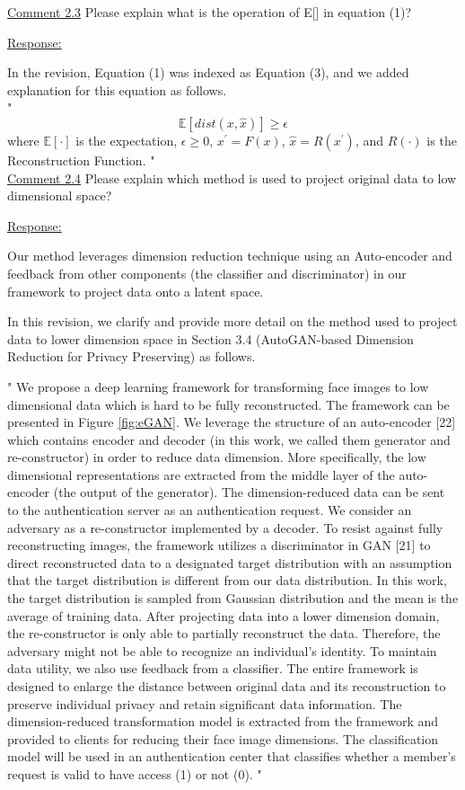 \documentclass[]{elsarticle}
\begin{document}
\color{blue}
\underline{Comment 2.3}
Please explain what is the operation of E[] in equation (1)?

\color{black}
\underline{Response:}

In the revision, Equation (1) was indexed as Equation (3), and we added explanation for this equation as follows.\\
"
\setcounter{equation}{2}
\begin{equation}
\label{eq:modularity}
\mathbb{E}[dist(x, \hat{x})] \geq \epsilon
\end{equation}
where $\mathbb{E}[\cdot]$ is the expectation, $\epsilon \geq 0$, $x^{\prime}=F(x)$, $\hat{x}=R(x^{\prime})$, and $R(\cdot)$ is the Reconstruction Function.
" \\

\color{blue}
\underline{Comment 2.4}
Please explain which method is used to project original data to low dimensional space?

\color{black}
\underline{Response:}

Our method leverages dimension reduction technique using an Auto-encoder and feedback from other components (the classifier and discriminator) in our framework to project data onto a latent space.  

In this revision, we clarify and provide more detail on the method used to project data to lower dimension space in Section 3.4 (AutoGAN-based Dimension Reduction for Privacy Preserving) as follows.


	"
	We propose a deep learning framework for transforming face images to low dimensional data which is hard to be fully reconstructed. The framework can be presented in Figure \ref{fig:eGAN}. We leverage the structure of an auto-encoder [22] which contains encoder and decoder (in this work, we called them generator and re-constructor) in order to reduce data dimension. More specifically, the low dimensional representations are extracted from the middle layer of the auto-encoder (the output of the generator). The dimension-reduced data can be sent to the authentication server as an authentication request. We consider an adversary as a re-constructor implemented by a decoder. To resist against fully reconstructing images, the framework utilizes a discriminator in GAN [21] to direct reconstructed data to a designated target distribution with an assumption that the target distribution is different from our data distribution. In this work, the target distribution is sampled from Gaussian distribution and the mean is the average of training data. After projecting data into a lower dimension domain, the re-constructor is only able to partially reconstruct the data. Therefore, the adversary might not be able to recognize an individual's identity. To maintain data utility, we also use feedback from a classifier. The entire framework is designed to enlarge the distance between original data and its reconstruction to preserve individual privacy and retain significant data information. The dimension-reduced transformation model is extracted from the framework and provided to clients for reducing their face image dimensions. The classification model will be used in an authentication center that classifies whether a member's request is valid to have access (1) or not (0). 
	"
\end{document}
